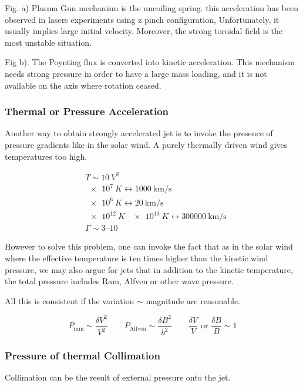 \documentclass[10pt,a4paper,english]{article}
\begin{document}

Fig. a) Plasma Gun mechanism is the uncoiling spring. this acceleration has been observed in lasers experiments using z pinch configuration, Unfortunately, it usually implies large initial velocity.
Moreover, the strong toroidal field is the most unstable situation.

Fig b). The Poynting flux is converted into kinetic acceleration. This mechanism needs strong pressure
in order to have  a large mass loading, and it is not available on the axis where rotation ceased.

\subsubsection{Thermal or Pressure Acceleration}

Another way to obtain strongly accelerated jet is to invoke the presence of pressure gradients
like in the solar wind. A purely thermally driven wind gives temperatures too high.

\begin{align*}
    & T \sim \SI{10}{V^2} \\
    & \SI{e7}{K} \leftrightarrow	  \SI{1000}{\km\per \s } \\
    & \SI{e6}{K} \leftrightarrow \SI{20}{\km \per\s}  \\
    &\SIrange{e12}{e13}{K} \leftrightarrow  \SI{300000}{\km \per \s} \\
    & \Gamma \sim \numrange{3}{10}
\end{align*}

However to solve this problem, one can invoke the fact that as in the solar wind where the
effective temperature is ten times higher than the kinetic wind pressure, we may also argue
for jets that in addition to the kinetic temperature, the total pressure includes Ram, Alfven
or other wave pressure.


All this is consistent if the variation $\sim$ magnitude are reasonable.

\begin{equation}
    P_\mathrm{ram} \sim \frac{\delta V^2}{V^2} \qquad
    P_\mathrm{Alfven}	\sim \frac{\delta B^2}{b^2} \qquad
    \frac{\delta V}{V } \text{ or } \frac{\delta B}{B} \sim 1
\end{equation}
\subsubsection{Pressure of thermal Collimation}
Collimation can be the result of external pressure onto the jet.
\end{document}
